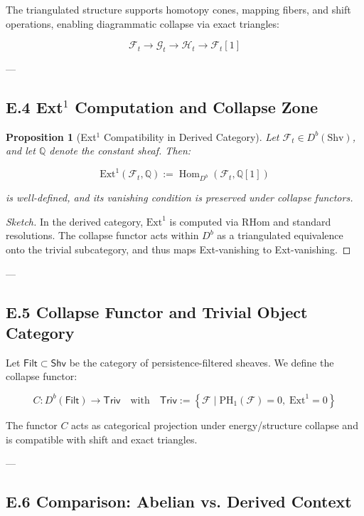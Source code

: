 \documentclass[11pt]{article}
\newtheorem{proposition}[theorem]{Proposition}
\begin{document}
The triangulated structure supports homotopy cones, mapping fibers, and shift operations,  
enabling diagrammatic collapse via exact triangles:

\[
\mathcal{F}_t \to \mathcal{G}_t \to \mathcal{H}_t \to \mathcal{F}_t[1]
\]

---

\subsection*{E.4 Ext$^1$ Computation and Collapse Zone}

\begin{proposition}[Ext$^1$ Compatibility in Derived Category]
Let \( \mathcal{F}_t \in D^b(\mathrm{Shv}) \), and let \( \mathbb{Q} \) denote the constant sheaf.  
Then:

\[
\mathrm{Ext}^1(\mathcal{F}_t, \mathbb{Q}) := \operatorname{Hom}_{D^b}(\mathcal{F}_t, \mathbb{Q}[1])
\]

is well-defined, and its vanishing condition is preserved under collapse functors.
\end{proposition}

\begin{proof}[Sketch]
In the derived category, \( \mathrm{Ext}^1 \) is computed via RHom and standard resolutions.  
The collapse functor acts within \( D^b \) as a triangulated equivalence onto the trivial subcategory,  
and thus maps Ext-vanishing to Ext-vanishing.
\end{proof}

---

\subsection*{E.5 Collapse Functor and Trivial Object Category}

Let \( \mathsf{Filt} \subset \mathsf{Shv} \) be the category of persistence-filtered sheaves.  
We define the collapse functor:

\[
C : D^b(\mathsf{Filt}) \to \mathsf{Triv}
\quad \text{with} \quad \mathsf{Triv} := \left\{ \mathcal{F} \mid \mathrm{PH}_1(\mathcal{F}) = 0,\; \mathrm{Ext}^1 = 0 \right\}
\]

The functor \( C \) acts as categorical projection under energy/structure collapse  
and is compatible with shift and exact triangles.

---

\subsection*{E.6 Comparison: Abelian vs. Derived Context}
\end{document}
